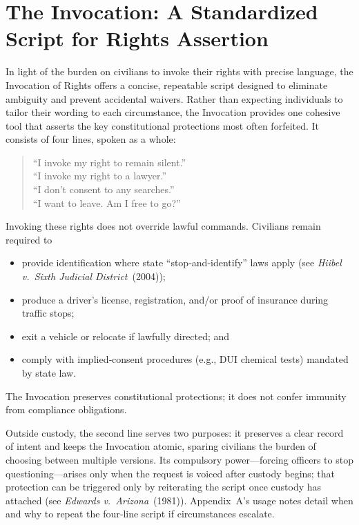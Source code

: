 \section{The Invocation: A Standardized Script for Rights Assertion}

In light of the burden on civilians to invoke their rights with precise language, the Invocation of Rights offers a concise, repeatable script designed to eliminate ambiguity and prevent accidental waivers. Rather than expecting individuals to tailor their wording to each circumstance, the Invocation provides one cohesive tool that asserts the key constitutional protections most often forfeited. It consists of four lines, spoken as a whole:

\begin{quote}
``I invoke my right to remain silent.''\\
``I invoke my right to a lawyer.''\\
``I don’t consent to any searches.''\\
``I want to leave. Am I free to go?''
\end{quote}

\begin{tcolorbox}[colback=gray!10,colframe=black!50,title=Legal‑Compliance Reminder,left=1em,right=1em]
Invoking these rights does not override lawful commands. Civilians remain required to
\begin{itemize}[leftmargin=*,noitemsep,topsep=0pt]
  \item provide identification where state ``stop‑and‑identify'' laws apply (see \textit{Hiibel v.\ Sixth Judicial District} (2004));
  \item produce a driver’s license, registration, and/or proof of insurance during traffic stops;
  \item exit a vehicle or relocate if lawfully directed; and
  \item comply with implied‑consent procedures (e.g., DUI chemical tests) mandated by state law.
\end{itemize}
The Invocation preserves constitutional protections; it does not confer immunity from compliance obligations.
\end{tcolorbox}

Outside custody, the second line serves two purposes: it preserves a clear record of intent and keeps the Invocation atomic, sparing civilians the burden of choosing between multiple versions. Its compulsory power—forcing officers to stop questioning—arises only when the request is voiced after custody begins; that protection can be triggered only by reiterating the script once custody has attached (see \textit{Edwards v.\ Arizona} (1981)). Appendix A’s usage notes detail when and why to repeat the four‑line script if circumstances escalate.

